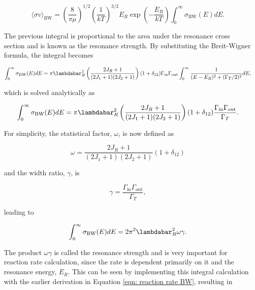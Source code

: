 \begin{equation}
\langle \sigma v \rangle_{\text{BW}} = \left( \frac{8}{\pi \mu} \right) ^{1/2} \left( \frac{1}{kT} \right) ^{3/2} E_{R} \exp \left(-\dfrac{E_{R}}{kT} \right) \int_{0}^{\infty} \sigma_{\text{BW}} (E) dE.
\end{equation}

\noindent The previous integral is proportional to the area under the resonance cross section and is known as the resonance strength. By substituting the Breit-Wigner formula, the integral becomes

\begin{equation}
\int_{0}^{\infty} \sigma_{\text{BW}} (E) dE = \pi \lambdabar_{R}^{2} \left(  \frac{2J_R+1}{(2J_1+1)(2J_2+1)} \right) (1 + \delta_{12}) \Gamma_{\text{in}} \Gamma_{\text{out}} \int_{0}^{\infty} \dfrac{1}{(E-E_{R})^{2} + (\Gamma_{T}/2)^{2}} dE,
\end{equation}

\noindent which is solved analytically as

\begin{equation}
\int_{0}^{\infty} \sigma_{\text{BW}} (E) dE = \pi \lambdabar_{R}^{2} \left(  \frac{2J_R+1}{(2J_1+1)(2J_2+1)} \right)  (1 + \delta_{12}) \frac{\Gamma_{\text{in}} \Gamma_{\text{out}} }{\Gamma_{T}}.
\end{equation}

\noindent For simplicity, the statistical factor, $\omega$, is now defined as

\begin{equation}
\omega = \frac{2J_R+1}{(2J_1+1)(2J_2+1)} (1 + \delta_{12})
\label{eqn: statisticalFactor}
\end{equation}

\noindent and the width ratio, $\gamma$, is

\begin{equation}
\gamma = \dfrac{\Gamma_{\text{in}} \Gamma_{\text{out}}}{\Gamma_{T}}, 
\end{equation}

\noindent leading to 

\begin{equation}
\int_{0}^{\infty} \sigma_{\text{BW}} (E) dE = 2\pi^{2} \lambdabar_{R}^{2} \omega \gamma.
\end{equation}

\noindent The product $\omega \gamma$ is called the resonance strength and is very important for reaction rate calculation, since the rate is dependent primarily on it and the resonance energy, $E_{R}$. This can be seen by implementing this integral calculation with the earlier derivation in Equation \ref{eqn: reaction rate BW}, resulting in

